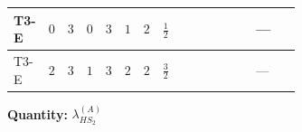 \documentclass[8pt]{article}
\begin{document}
\begin{landscape}
\begin{longtable}{@{}llcccccc >{\raggedright\arraybackslash}p{0.21\linewidth} >{\raggedright\arraybackslash}p{0.21\linewidth} >{\raggedright\arraybackslash}p{0.21\linewidth}@{}}
\midrule
T3-E & $0$ & $3$ & $0$ & $3$ & $1$ & $2$ & $\frac{1}{2}$ & \scriptsize\adjustbox{max width=\linewidth}{$\begin{gathered} +8 {\lambda_{HS_2}^{(1)}} {\lambda_{HS_2}^{(A)}}\end{gathered}$} & \scriptsize\adjustbox{max width=\linewidth}{$\begin{gathered} +2 {\lambda_{HS_2}^{(A)}} {\lambda_{S_2}^{(1)}}\end{gathered}$} & --- \\
\midrule
T3-E & $2$ & $3$ & $1$ & $3$ & $2$ & $2$ & $\frac{3}{2}$ & \scriptsize\adjustbox{max width=\linewidth}{$\begin{gathered} +8 {\lambda_{HS_2}^{(1)}} {\lambda_{HS_2}^{(A)}}\end{gathered}$} & \scriptsize\adjustbox{max width=\linewidth}{$\begin{gathered} +2 {\lambda_{HS_2}^{(A)}} {\lambda_{S_2}^{(1)}}\end{gathered}$} & --- \\
\midrule
\bottomrule
\end{longtable}
\clearpage
\noindent\textbf{Quantity: }$\lambda_{HS_2}^{(A)}$\par\smallskip

\end{landscape}
\end{document}

